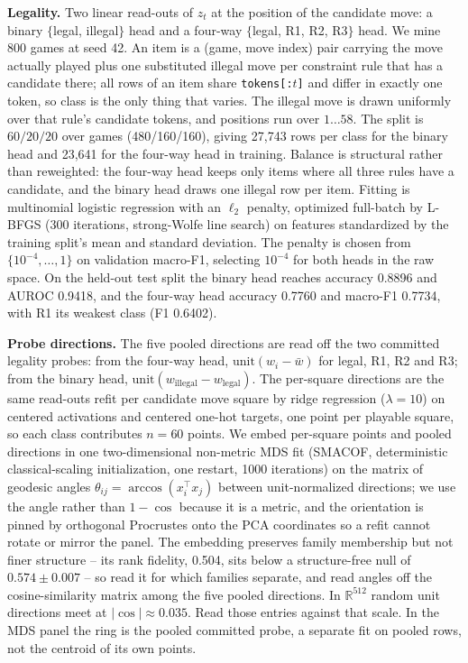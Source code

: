 \textbf{Legality.} Two linear read-outs of $z_t$ at the position of the candidate move: a binary
$\{$legal, illegal$\}$ head and a four-way $\{$legal, R1, R2, R3$\}$ head. We mine 800 games at
seed 42. An item is a (game, move index) pair carrying the move actually played plus one
substituted illegal move per constraint rule that has a candidate there; all rows of an item
share \texttt{tokens[:$t$]} and differ in exactly one token, so class is the only thing that
varies. The illegal move is drawn uniformly over that rule's candidate tokens, and positions run
over $1 \ldots 58$. The split is $60/20/20$ over games (480/160/160), giving 27,743 rows per
class for the binary head and 23,641 for the four-way head in training. Balance is structural
rather than reweighted: the four-way head keeps only items where all three rules have a
candidate, and the binary head draws one illegal row per item. Fitting is multinomial logistic
regression with an $\ell_2$ penalty, optimized full-batch by L-BFGS (300 iterations,
strong-Wolfe line search) on features standardized by the training split's mean and standard
deviation. The penalty is chosen from $\{10^{-4}, \ldots, 1\}$ on validation macro-F1, selecting
$10^{-4}$ for both heads in the raw space. On the held-out test split the binary head reaches accuracy 0.8896 and
AUROC 0.9418, and the four-way head accuracy 0.7760 and macro-F1 0.7734, with R1 its weakest
class (F1 0.6402).

\textbf{Probe directions.} The five pooled directions are read off the two committed legality
probes: from the four-way head, $\mathrm{unit}(w_i - \bar{w})$ for legal, R1, R2 and R3; from the
binary head, $\mathrm{unit}(w_{\mathrm{illegal}} - w_{\mathrm{legal}})$. The per-square directions are the
same read-outs refit per candidate move square by ridge regression ($\lambda = 10$) on centered
activations and centered one-hot targets, one point per playable square, so each class
contributes $n = 60$ points. We embed per-square points and pooled directions in one
two-dimensional non-metric MDS fit (SMACOF, deterministic classical-scaling initialization, one
restart, 1000 iterations) on the matrix of geodesic angles $\theta_{ij} = \arccos(x_i^\top x_j)$
between unit-normalized directions; we use the angle rather than $1 - \cos$ because it is a
metric, and the orientation is pinned by orthogonal Procrustes onto the PCA coordinates so a
refit cannot rotate or mirror the panel. The embedding preserves family membership but not finer
structure -- its rank fidelity, 0.504, sits below a structure-free null of $0.574 \pm 0.007$ --
so read it for which families separate, and read angles off the cosine-similarity matrix among
the five pooled directions. In $\mathbb{R}^{512}$ random unit directions meet at $|\cos| \approx
0.035$. Read those entries against that scale. In the MDS panel
the ring is the pooled committed probe, a separate fit on pooled rows, not the centroid of its
own points.

